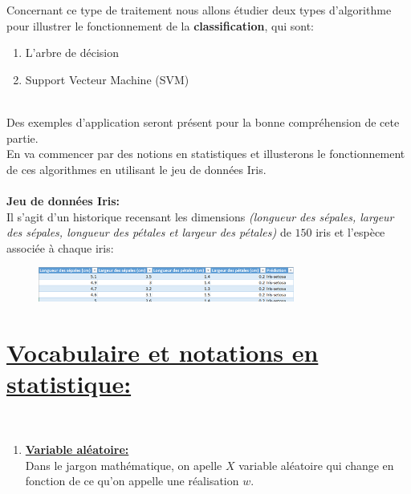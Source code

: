 \documentclass[11pt,twoside,openany,x11names,svgnames]{memoir}
\begin{document}
\begin{itemize}
		Concernant ce type de traitement nous allons étudier deux types d'algorithme pour illustrer le fonctionnement de la \textbf{classification}, qui sont: \\
		\begin{enumerate}
		\item {L'arbre de décision}
		\item{Support Vecteur Machine (SVM)}
		\end{enumerate} \\
		Des exemples d'application seront présent pour la bonne compréhension de cete partie. \\
		En va commencer par des notions en statistiques et illusterons le fonctionnement de ces algorithmes en utilisant le jeu de données Iris. \\ 
		\\
		{\large{\textbf{Jeu de données Iris:}}}
		\\
		Il s'agit d'un historique recensant les dimensions \textsl{(longueur des sépales, largeur des sépales, longueur des pétales et largeur des pétales)} de $150$ iris et l'espèce associée à chaque iris: \\
		
		\begin{figure}[h]
			\centering
				\includegraphics[width=0.75\textwidth]{img1_iris.png}
			\label{}
		\end{figure}
		
		
		
		
		\section*{\large{\textbf{\underline{Vocabulaire et notations en statistique:}}}} 
		\\
		
		\begin{enumerate}
		\item {{\large{\textbf{\underline{Variable aléatoire:}}}}} \\
		Dans le jargon mathématique, on apelle $X$ variable aléatoire qui change en fonction de ce qu'on appelle une réalisation $w$. \\
		
		

\end{enumerate}
\end{itemize}
\end{document}
